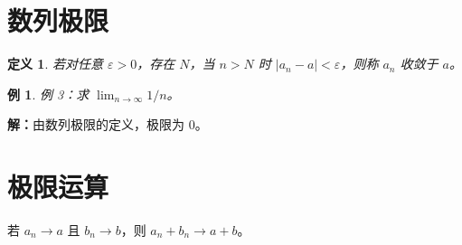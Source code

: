 \documentclass{ctexart}
\newtheorem{definition}{定义}
\newtheorem{example}{例}
\begin{document}
\section{数列极限}
\begin{definition}若对任意 $\varepsilon>0$，存在 $N$，当 $n>N$ 时 $|a_n-a|<\varepsilon$，则称 $a_n$ 收敛于 $a$。\end{definition}
\begin{example}例 3：求 $\lim_{n\to\infty} 1/n$。\end{example}
\textbf{解：}由数列极限的定义，极限为 $0$。
\section{极限运算}
若 $a_n\to a$ 且 $b_n\to b$，则 $a_n+b_n\to a+b$。
\end{document}
